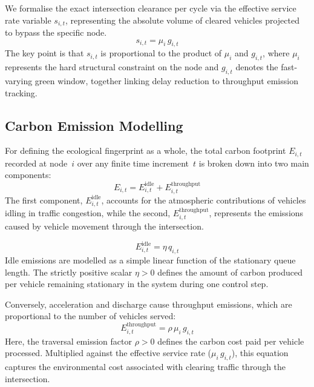 \documentclass[journal]{IEEEtran}
\begin{document}
We formalise the exact intersection clearance per cycle via the effective service rate variable $s_{i,t}$, representing the absolute volume of cleared vehicles projected to bypass the specific node.
\begin{equation}
    s_{i,t} = \mu_i\, g_{i,t}
    \label{eq:service}
\end{equation}
The key point is that $s_{i,t}$ is proportional to the product of $\mu_i$ and $g_{i,t}$, where $\mu_i$ represents the hard structural constraint on the node and $g_{i,t}$ denotes the fast-varying green window, together linking delay reduction to throughput emission tracking.

\subsection{Carbon Emission Modelling}
For defining the ecological fingerprint as a whole, the total carbon footprint $E_{i,t}$ recorded at node~$i$ over any finite time increment~$t$ is broken down into two main components:
\begin{equation}
    E_{i,t} = E_{i,t}^{\text{idle}} + E_{i,t}^{\text{throughput}}
    \label{eq:emission_total}
\end{equation}
The first component, $E_{i,t}^{\text{idle}}$, accounts for the atmospheric contributions of vehicles idling in traffic congestion, while the second, $E_{i,t}^{\text{throughput}}$, represents the emissions caused by vehicle movement through the intersection.

\begin{equation}
    E_{i,t}^{\text{idle}} = \eta\, q_{i,t}
    \label{eq:idle_emission}
\end{equation}
Idle emissions are modelled as a simple linear function of the stationary queue length. The strictly positive scalar $\eta > 0$ defines the amount of carbon produced per vehicle remaining stationary in the system during one control step.

Conversely, acceleration and discharge cause throughput emissions, which are proportional to the number of vehicles served:
\begin{equation}
    E_{i,t}^{\text{throughput}} = \rho\, \mu_i\, g_{i,t}
    \label{eq:throughput_emission}
\end{equation}
Here, the traversal emission factor $\rho > 0$ defines the carbon cost paid per vehicle processed. Multiplied against the effective service rate ($\mu_i\,g_{i,t}$), this equation captures the environmental cost associated with clearing traffic through the intersection.
\end{document}
